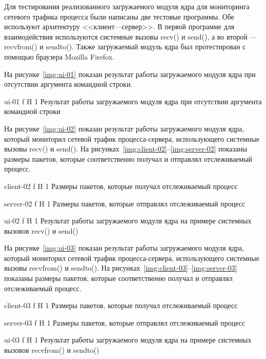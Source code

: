 \documentclass{bmstu}
\begin{document}
Для тестирования реализованного загружаемого модуля ядра для мониторинга сетевого трафика процесса были написаны две тестовые программы. 
Обе используют архитектуру <<клиент---сервер>>. 
В первой программе для взаимодействия используются системные вызовы recv() и send(), а во второй --- recvfrom() и sendto().
Также загружаемый модуль ядра был протестирован с помощью браузера Mozilla Firefox.

На рисунке~\ref{img:ui-01} показан результат работы загружаемого модуля ядра при отсутствии аргумента командной строки.

    {ui-01}
    {f}
    {H}
    {1\textwidth}
    {Результат работы загружаемого модуля ядра при отсутствии аргумента командной строки}
 
На рисунке~\ref{img:ui-02} показан результат работы загружаемого модуля ядра, который мониторил сетевой трафик процесса-сервера, использующего системные вызовы recv() и send(). 
На рисунках~\ref{img:client-02}--\ref{img:server-02} показаны размеры пакетов, которые соответственно получал и отправлял отслеживаемый процесс.

    {client-02}
    {f}
    {H}
    {1\textwidth}
    {Размеры пакетов, которые получал отслеживаемый процесс}
    
    {server-02}
    {f}
    {H}
    {1\textwidth}
    {Размеры пакетов, которые отправлял отслеживаемый процесс}

    {ui-02}
    {f}
    {H}
    {1\textwidth}
    {Результат работы загружаемого модуля ядра на примере системных вызовов recv() и send()}
    
На рисунке~\ref{img:ui-03} показан результат работы загружаемого модуля ядра, который мониторил сетевой трафик процесса-сервера, использующего системные вызовы recvfrom() и sendto(). 
На рисунках~\ref{img:client-03}--\ref{img:server-03} показаны размеры пакетов, которые соответственно получал и отправлял отслеживаемый процесс.

    {client-03}
    {f}
    {H}
    {1\textwidth}
    {Размеры пакетов, которые получал отслеживаемый процесс}
    
    {server-03}
    {f}
    {H}
    {1\textwidth}
    {Размеры пакетов, которые отправлял отслеживаемый процесс}

    {ui-03}
    {f}
    {H}
    {1\textwidth}
    {Результат работы загружаемого модуля ядра на примере системных вызовов recvfrom() и sendto()}
    
\end{document}
